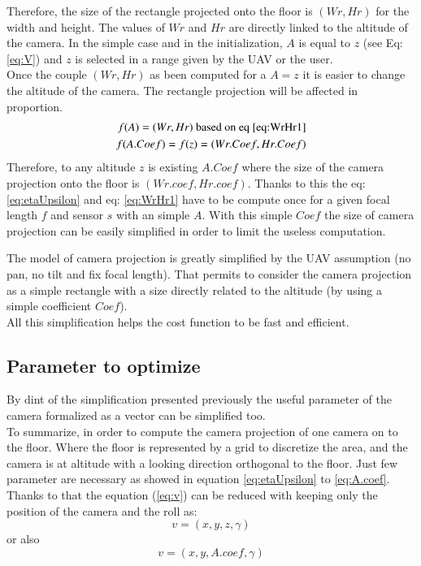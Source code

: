 Therefore, the size of the rectangle projected onto the floor is $(Wr,Hr)$ for the width and height. The values of $Wr$ and $Hr$ are directly linked to the altitude of the camera. In the simple case and in the initialization, $A$ is equal to $z$ (see Eq:\ref{eq:V})  and $z$ is selected in a range given by the UAV or the user. \\
Once the couple $(Wr,Hr)$ as been computed for a $A=z$ it is easier to change the altitude of the camera. The rectangle projection will be affected in proportion.
	\begin{equation}\label{eq:A.coef}
		\begin{split}
 		   	f(A)= (Wr,Hr) \text{ based on eq \ref{eq:WrHr1}}\\
    		f(A.Coef)=f(z)= (Wr.Coef,Hr.Coef)      
    	 \end{split} 
	\end{equation}
Therefore, to any altitude $z$ is existing $A.Coef$ where the size of the camera projection onto the floor is $(Wr.coef, Hr.coef)$. Thanks to this the eq: \ref{eq:etaUpsilon} and eq: \ref{eq:WrHr1} have to be compute once  for a given focal length $f$  and sensor $s$ with an simple $A$. With this simple $Coef$ the size of camera projection can be easily simplified in order to limit the useless computation.

The model of camera projection is greatly simplified by the UAV assumption (no pan, no tilt and fix focal length). That permits to consider  the camera projection as a simple rectangle with a size directly related to the altitude (by using a simple coefficient $Coef$).\\
All this simplification helps the cost function to be fast and efficient. \\

\subsection*{Parameter to optimize }\label{sec:parameterToOptimize}
By dint of the simplification presented previously the useful parameter of the camera formalized as a vector can be simplified too.\\
To summarize, in order to compute the camera projection of one camera on to the floor. Where the floor is represented by a grid to discretize the area, and the camera is at altitude with a looking direction orthogonal to the floor.  Just few parameter are necessary  as showed in equation  \ref{eq:etaUpsilon} %
to \ref{eq:A.coef}. Thanks to that the equation (\ref{eq:v})  can be reduced with keeping only the position of the camera and the roll as:
	\begin{equation}\label{eq:v2}
		v=(x,y,z,\gamma )
	\end{equation}
	or also
	\begin{equation}\label{eq:v2}
		v=(x,y,A.coef,\gamma )
	\end{equation}

